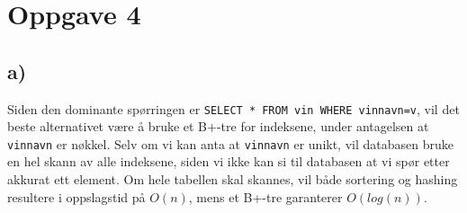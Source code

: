 \section{Oppgave 4}

\subsection{a)}

Siden den dominante spørringen er \texttt{SELECT * FROM vin WHERE vinnavn=v}, vil det beste alternativet være å bruke et B+-tre for indeksene, under antagelsen at \texttt{vinnavn} er nøkkel. Selv om vi kan anta at \texttt{vinnavn} er unikt, vil databasen bruke en hel skann av alle indeksene, siden vi ikke kan si til databasen at vi spør etter akkurat ett element. Om hele tabellen skal skannes, vil både sortering og hashing resultere i oppslagstid på $O(n)$, mens et B+-tre garanterer $O(log(n))$.
